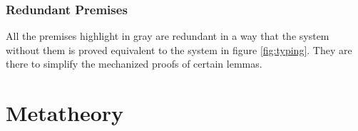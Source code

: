 \documentclass{llncs}
\begin{document}
\subsubsection{Redundant Premises}

All the premises highlight in gray are redundant in a way that
the system without them is proved equivalent to the system in figure \ref{fig:typing}.
They are there to simplify the mechanized proofs of certain lemmas.

\section{Metatheory}



\end{document}
